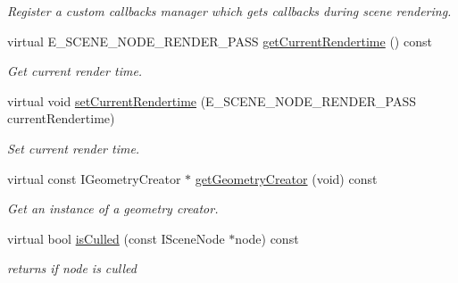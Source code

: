 \begin{DoxyCompactItemize}
\begin{DoxyCompactList}\small\item\em Register a custom callbacks manager which gets callbacks during scene rendering. \end{DoxyCompactList}\item 
\hypertarget{classirr_1_1scene_1_1_c_scene_manager_aa385076e969cdbbc6f569d500515696f}{virtual E\-\_\-\-S\-C\-E\-N\-E\-\_\-\-N\-O\-D\-E\-\_\-\-R\-E\-N\-D\-E\-R\-\_\-\-P\-A\-S\-S \hyperlink{classirr_1_1scene_1_1_c_scene_manager_aa385076e969cdbbc6f569d500515696f}{get\-Current\-Rendertime} () const }\label{classirr_1_1scene_1_1_c_scene_manager_aa385076e969cdbbc6f569d500515696f}

\begin{DoxyCompactList}\small\item\em Get current render time. \end{DoxyCompactList}\item 
\hypertarget{classirr_1_1scene_1_1_c_scene_manager_ac284c2ffc268c8c73416e39a4d392f4b}{virtual void \hyperlink{classirr_1_1scene_1_1_c_scene_manager_ac284c2ffc268c8c73416e39a4d392f4b}{set\-Current\-Rendertime} (E\-\_\-\-S\-C\-E\-N\-E\-\_\-\-N\-O\-D\-E\-\_\-\-R\-E\-N\-D\-E\-R\-\_\-\-P\-A\-S\-S current\-Rendertime)}\label{classirr_1_1scene_1_1_c_scene_manager_ac284c2ffc268c8c73416e39a4d392f4b}

\begin{DoxyCompactList}\small\item\em Set current render time. \end{DoxyCompactList}\item 
\hypertarget{classirr_1_1scene_1_1_c_scene_manager_abaa88110c036134910b1ce38cdd9154a}{virtual const I\-Geometry\-Creator $\ast$ \hyperlink{classirr_1_1scene_1_1_c_scene_manager_abaa88110c036134910b1ce38cdd9154a}{get\-Geometry\-Creator} (void) const }\label{classirr_1_1scene_1_1_c_scene_manager_abaa88110c036134910b1ce38cdd9154a}

\begin{DoxyCompactList}\small\item\em Get an instance of a geometry creator. \end{DoxyCompactList}\item 
\hypertarget{classirr_1_1scene_1_1_c_scene_manager_a9fb5f00898e5d62d9b4df34478a82c37}{virtual bool \hyperlink{classirr_1_1scene_1_1_c_scene_manager_a9fb5f00898e5d62d9b4df34478a82c37}{is\-Culled} (const I\-Scene\-Node $\ast$node) const }\label{classirr_1_1scene_1_1_c_scene_manager_a9fb5f00898e5d62d9b4df34478a82c37}

\begin{DoxyCompactList}\small\item\em returns if node is culled \end{DoxyCompactList}\end{DoxyCompactItemize}


